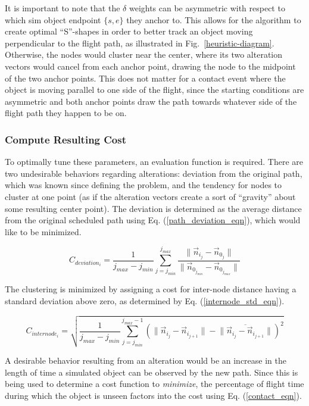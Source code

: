 \documentclass[conf]{new-aiaa}
\begin{document}
It is important to note that the $\delta$ weights can be asymmetric with respect to which sim object endpoint $\{s,e\}$ they anchor to. This allows for the algorithm to create optimal ``S''-shapes in order to better track an object moving perpendicular to the flight path, as illustrated in Fig.~\ref{heuristic-diagram}. Otherwise, the nodes would cluster near the center, where its two alteration vectors would cancel from each anchor point, drawing the node to the midpoint of the two anchor points. This does not matter for a contact event where the object is moving parallel to one side of the flight, since the starting conditions are asymmetric and both anchor points draw the path towards whatever side of the flight path they happen to be on.

\subsubsection{Compute Resulting Cost}
To optimally tune these parameters, an evaluation function is required. There are two undesirable behaviors regarding alterations: deviation from the original path, which was known since defining the problem, and the tendency for nodes to cluster at one point (as if the alteration vectors create a sort of ``gravity'' about some resulting center point). The deviation is determined as the average distance from the original scheduled path using Eq. (\ref{path_deviation_eqn}), which would like to be minimized. 

\begin{equation}
\label{path_deviation_eqn}
C_{deviation_i} = \frac{1}{j_{max} - j_{min}}\sum\limits_{j=j_{min}}^{j_{max}}\frac{\|\vec{n}_{i_j} - \vec{n}_{0_j}\|}{\|\vec{n}_{0_{j_{min}}} - \vec{n}_{0_{j_{max}}}\|}
\end{equation}

The clustering is minimized by assigning a cost for inter-node distance having a standard deviation above zero, as determined by Eq. (\ref{internode_std_eqn}).

\begin{equation}
\label{internode_std_eqn}
C_{internode_i} = \sqrt{\frac{1}{j_{max} - j_{min}}\sum\limits_{j=j_{min}}^{j_{max} - 1}\left(\|\vec{n}_{i_j} - \vec{n}_{i_{j + 1}}\| - \overline{\|\vec{n}_{i_j} - \vec{n}_{i_{j + 1}}\|}\right)^2}
\end{equation}

A desirable behavior resulting from an alteration would be an increase in the length of time a simulated object can be observed by the new path. Since this is being used to determine a cost function to \emph{minimize}, the percentage of flight time during which the object is unseen factors into the cost using Eq. (\ref{contact_eqn}).
\end{document}
